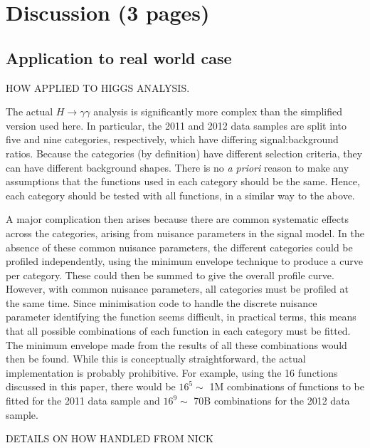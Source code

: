 \section{Discussion (3 pages)}
\label{sec:discussion}

\subsection{Application to real world case}
\label{sec:discussion:higgs}

HOW APPLIED TO HIGGS ANALYSIS.

The actual $H \rightarrow \gamma\gamma$ analysis is significantly more
complex than the simplified version used here. In particular, the 2011 
and 2012 data
samples are split into five and nine categories, respectively, which have
differing signal:background ratios.
Because the categories (by definition) have different selection criteria,
they can have different background shapes.
There is no {\it a priori} reason to make any assumptions that the functions
used in each category should be the same. Hence, each category should be
tested with all functions, in a similar way to the above.

A major complication then arises because there are common systematic effects
across the categories, arising from nuisance parameters in the signal
model.
In the absence of these common nuisance parameters,
the different categories could be profiled independently, using the
minimum envelope technique to produce a curve per category. These could then
be summed to give the overall profile curve. However, with common
nuisance parameters, all categories must be profiled at the same time.
Since minimisation code to handle the 
discrete nuisance parameter identifying the
function seems difficult, in practical terms, this means that all possible
combinations of each function in each category must be fitted.
The minimum envelope made from the results of all these combinations would
then be found. While this is conceptually straightforward, the actual
implementation is probably prohibitive. For example, using the 16 functions
discussed in this paper, there would be $16^5 \sim$ 1M combinations of functions
to be fitted for the 2011 data sample and $16^9 \sim$ 70B combinations for the
2012 data sample.

DETAILS ON HOW HANDLED FROM NICK





